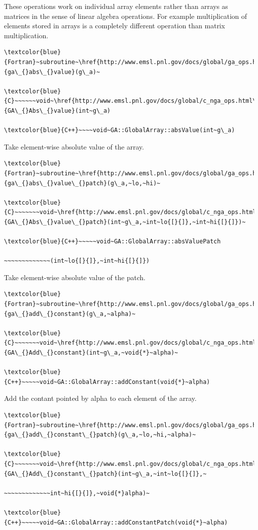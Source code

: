 These operations work on individual array elements rather than arrays
as matrices in the sense of linear algebra operations. For example
multiplication of elements stored in arrays is a completely different
operation than matrix multiplication.
\begin{verbatim}
\textcolor{blue}{Fortran}~subroutine~\href{http://www.emsl.pnl.gov/docs/global/ga_ops.html\#ga_abs_value}{ga\_{}abs\_{}value}(g\_a)~

\textcolor{blue}{C}~~~~~~void~\href{http://www.emsl.pnl.gov/docs/global/c_nga_ops.html\#ga_abs_value}{GA\_{}Abs\_{}value}(int~g\_a)

\textcolor{blue}{C++}~~~~void~GA::GlobalArray::absValue(int~g\_a)
\end{verbatim}
Take element-wise absolute value of the array. 
\begin{verbatim}
\textcolor{blue}{Fortran}~subroutine~\href{http://www.emsl.pnl.gov/docs/global/ga_ops.html\#ga_abs_value_patch}{ga\_{}abs\_{}value\_{}patch}(g\_a,~lo,~hi)~

\textcolor{blue}{C}~~~~~~~void~\href{http://www.emsl.pnl.gov/docs/global/c_nga_ops.html\#ga_abs_value_patch}{GA\_{}Abs\_{}value\_{}patch}(int~g\_a,~int~lo{[}{]},~int~hi{[}{]})~

\textcolor{blue}{C++}~~~~~void~GA::GlobalArray::absValuePatch

~~~~~~~~~~~~~(int~lo{[}{]},~int~hi{[}{]})
\end{verbatim}
Take element-wise absolute value of the patch.
\begin{verbatim}
\textcolor{blue}{Fortran}~subroutine~\href{http://www.emsl.pnl.gov/docs/global/ga_ops.html\#ga_add_constant}{ga\_{}add\_{}constant}(g\_a,~alpha)~

\textcolor{blue}{C}~~~~~~~void~\href{http://www.emsl.pnl.gov/docs/global/c_nga_ops.html\#ga_add_constant}{GA\_{}Add\_{}constant}(int~g\_a,~void{*}~alpha)~

\textcolor{blue}{C++}~~~~~void~GA::GlobalArray::addConstant(void{*}~alpha)
\end{verbatim}
Add the contant pointed by alpha to each element of the array. 
\begin{verbatim}
\textcolor{blue}{Fortran}~subroutine~\href{http://www.emsl.pnl.gov/docs/global/ga_ops.html\#ga_add_constant_patch}{ga\_{}add\_{}constant\_{}patch}(g\_a,~lo,~hi,~alpha)~

\textcolor{blue}{C}~~~~~~~void~\href{http://www.emsl.pnl.gov/docs/global/c_nga_ops.html\#ga_add_constant_patch}{GA\_{}Add\_{}constant\_{}patch}(int~g\_a,~int~lo{[}{]},~

~~~~~~~~~~~~~int~hi{[}{]},~void{*}alpha)~

\textcolor{blue}{C++}~~~~~void~GA::GlobalArray::addConstantPatch(void{*}~alpha)
\end{verbatim}
